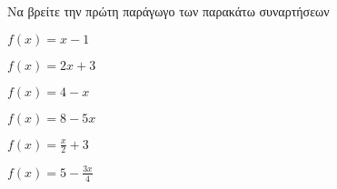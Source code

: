 Να βρείτε την πρώτη παράγωγο των παρακάτω συναρτήσεων
\begin{alist}
\begin{multicols}{2}
\item $ f(x)=x-1 $
\item $ f(x)=2x+3 $
\item $ f(x)=4-x $
\item $ f(x)=8-5x $
\item $ f(x)=\frac{x}{2}+3 $
\item $ f(x)=5-\frac{3x}{4} $
\end{multicols}
\end{alist}

